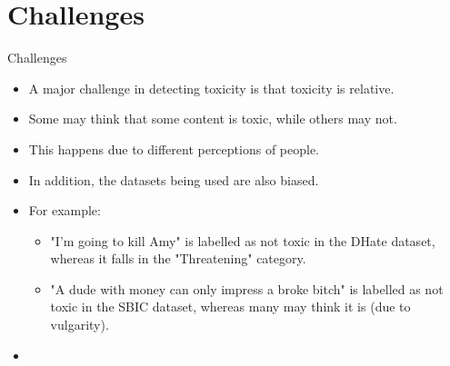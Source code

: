 \section{Challenges}

\begin{frame}{Challenges}




\begin{itemize}

    \item A major challenge in detecting toxicity is that toxicity is relative.
    \item Some may think that some content is toxic, while others may not.
    \item This happens due to different perceptions of people.
    \item In addition, the datasets being used are also biased.
    \item For example:
    \begin{itemize}
        \item "I'm going to kill Amy" is labelled as not toxic in the DHate dataset, whereas it falls in the "Threatening" category.
        \item "A dude with money can only impress a broke bitch" is labelled as not toxic in the SBIC dataset, whereas many may think it is (due to vulgarity).
    \end{itemize}

\end{itemize}

\begin{itemize}
    \item 
\end{itemize}

\end{frame}
